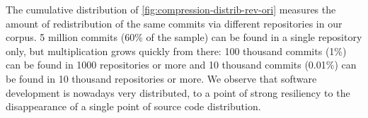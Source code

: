 The cumulative distribution of \cref{fig:compression-distrib-rev-ori} measures
the amount of redistribution of the same commits via different repositories in
our corpus. 5 million commits (60\% of the sample) can be found in a single
repository only, but multiplication grows quickly from there: 100 thousand
commits (1\%) can be found in 1000 repositories or more and 10 thousand commits
(0.01\%) can be found in 10 thousand repositories or more. We observe that
software development is nowadays very distributed, to a point of strong
resiliency to the disappearance of a single point of source code distribution.

\begin{figure}
\end{figure}

\begin{figure}
\end{figure}

